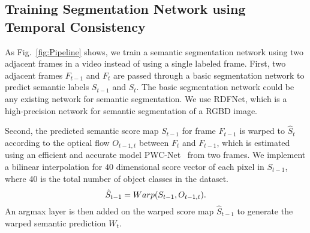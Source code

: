 \subsection{Training Segmentation Network using Temporal Consistency}
%
As Fig.~\ref{fig:Pipeline} shows, we train a semantic segmentation network using two adjacent frames in a video instead of using a single labeled frame.  
% 
First, two adjacent frames $F_{t-1}$ and $F_t$ are passed through a basic segmentation network to predict semantic labels $S_{t-1}$ and $S_{t}$.
%
The basic segmentation network could be any existing network for semantic segmentation. 
We use RDFNet\cite{Park2017}, which is a high-precision network for semantic segmentation of a RGBD image.



Second, the predicted semantic score map $S_{t-1}$ for frame $F_{t-1}$ is warped to $\hat{S}_{t}$ according to the optical flow $O_{t-1,t}$ between $F_t$ and $F_{t-1}$, which is estimated using an efficient and accurate model PWC-Net~\cite{Sun2018} from two frames. 
We implement a bilinear interpolation for $40$ dimensional score vector of each pixel in $S_{t-1}$, where 40 is the total number of object classes in the dataset. 
\begin{equation}
\centering
\hat{S}_{t-1}=Warp(S_{t-1},O_{t-1,t}).
\end{equation}
%
An argmax layer is then added on the warped score map ${\hat{S}_{t-1}}$ to generate the warped semantic prediction $W_{t}$.


